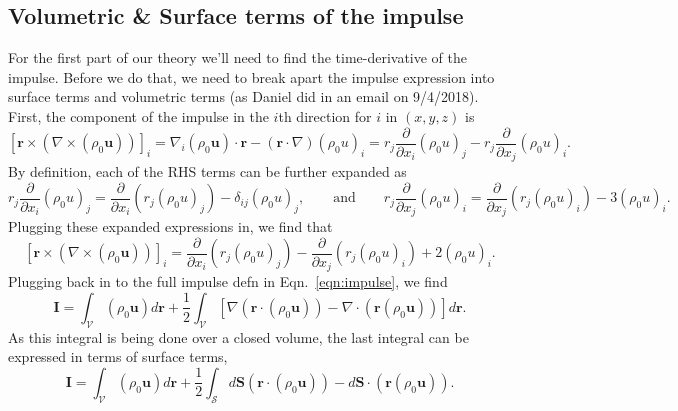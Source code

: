 \documentclass[onecolumn, amsmath, amsfonts, amssymb]{aastex62}
\newcommand{\grad}{\ensuremath{\nabla}}
\begin{document}
\subsection{Volumetric \& Surface terms of the impulse}
For the first part of our theory we'll need to find the time-derivative of the impulse. Before we do that, 
we need to break apart the impulse expression into surface terms and volumetric terms (as Daniel did in an email
on 9/4/2018). First, the component of the impulse in the $i$th direction for $i$ in $(x,y,z)$ is
$$
[\bm{r}\times(\grad\times(\rho_0\bm{u}))]_i = 
\grad_i(\rho_0\bm{u}) \cdot \bm{r}- (\bm{r}\cdot\grad)(\rho_0 u)_i = 
r_j\frac{\partial}{\partial x_i}(\rho_0 u)_j - r_j \frac{\partial}{\partial x_j}(\rho_0 u)_i.
$$
By definition, each of the RHS terms can be further expanded as
$$
r_j\frac{\partial}{\partial x_i}(\rho_0 u)_j =
\frac{\partial}{\partial x_i}(r_j(\rho_0 u)_j) - \delta_{ij}(\rho_0 u)_j,\qquad\text{and}
\qquad
r_j \frac{\partial}{\partial x_j}(\rho_0 u)_i =
\frac{\partial}{\partial x_j}(r_j(\rho_0 u)_i) - 3(\rho_0 u)_i.
$$
Plugging these expanded expressions in, we find that
$$
[\bm{r}\times(\grad\times(\rho_0\bm{u}))]_i = 
\frac{\partial}{\partial x_i}(r_j(\rho_0 u)_j) -
\frac{\partial}{\partial x_j}(r_j(\rho_0 u)_i) +
2(\rho_0 u)_i.
$$
Plugging back in to the full impulse defn in Eqn.~\ref{eqn:impulse}, we find
\begin{equation}
\bm{I} = \int_{\mathcal{V}} (\rho_0 \bm{u}) d\bm{r} + 
\frac{1}{2}\int_{\mathcal{V}} [\grad (\bm{r}\cdot(\rho_0 \bm{u})) - \grad \cdot(\bm{r}(\rho_0\bm{u}))] d\bm{r}.
\end{equation}
As this integral is being done over a closed volume, the last integral can be expressed in terms of surface terms,
\begin{equation}
\bm{I} = \int_{\mathcal{V}} (\rho_0 \bm{u}) d\bm{r} + 
\frac{1}{2}\int_{\mathcal{S}} d\bm{S}(\bm{r}\cdot(\rho_0 \bm{u})) - d\bm{S} \cdot(\bm{r}(\rho_0\bm{u})).
\label{eqn:surface_impulse}
\end{equation}
\end{document}

